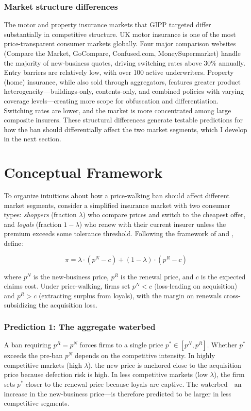 \documentclass[12pt]{article}
\begin{document}
\subsubsection*{Market structure differences} The motor and property insurance markets that GIPP targeted differ substantially in competitive structure. UK motor insurance is one of the most price-transparent consumer markets globally. Four major comparison websites (Compare the Market, GoCompare, Confused.com, MoneySupermarket) handle the majority of new-business quotes, driving switching rates above 30\% annually. Entry barriers are relatively low, with over 100 active underwriters. Property (home) insurance, while also sold through aggregators, features greater product heterogeneity---buildings-only, contents-only, and combined policies with varying coverage levels---creating more scope for obfuscation and differentiation. Switching rates are lower, and the market is more concentrated among large composite insurers. These structural differences generate testable predictions for how the ban should differentially affect the two market segments, which I develop in the next section.


\section{Conceptual Framework}
\label{sec:framework}

To organize intuitions about how a price-walking ban should affect different market segments, consider a simplified insurance market with two consumer types: \textit{shoppers} (fraction $\lambda$) who compare prices and switch to the cheapest offer, and \textit{loyals} (fraction $1-\lambda$) who renew with their current insurer unless the premium exceeds some tolerance threshold. Following the framework of \citet{ArmstrongVickers2001} and \citet{SalopStiglitz1977}, define:

\begin{equation}
\pi = \lambda \cdot (p^N - c) + (1-\lambda) \cdot (p^R - c)
\label{eq:profit}
\end{equation}

\noindent where $p^N$ is the new-business price, $p^R$ is the renewal price, and $c$ is the expected claims cost. Under price-walking, firms set $p^N < c$ (loss-leading on acquisition) and $p^R > c$ (extracting surplus from loyals), with the margin on renewals cross-subsidizing the acquisition loss.

\subsubsection*{Prediction 1: The aggregate waterbed} A ban requiring $p^R = p^N$ forces firms to a single price $p^* \in [p^N, p^R]$. Whether $p^*$ exceeds the pre-ban $p^N$ depends on the competitive intensity. In highly competitive markets (high $\lambda$), the new price is anchored close to the acquisition price because defection risk is high. In less competitive markets (low $\lambda$), the firm sets $p^*$ closer to the renewal price because loyals are captive. The waterbed---an increase in the new-business price---is therefore predicted to be larger in less competitive segments.
\end{document}
